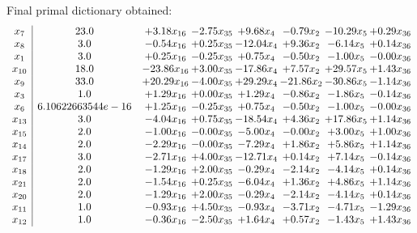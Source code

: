 \documentclass[8pt]{article}
\begin{document}
 Final primal dictionary obtained: 
\[\begin{array}{c| c c@{\hskip 2pt} c@{\hskip 2pt} c@{\hskip 2pt} c@{\hskip 2pt} c@{\hskip 2pt} c@{\hskip 2pt} }
 x_{7}   &  23.0 & +  3.18 x_{16} & -2.75 x_{35} & +  9.68 x_{4} & -0.79 x_{2} & -10.29 x_{5} & +  0.29 x_{36}\\
 x_{8}   &  3.0 & -0.54 x_{16} & +  0.25 x_{35} & -12.04 x_{4} & +  9.36 x_{2} & -6.14 x_{5} & +  0.14 x_{36}\\
 x_{1}   &  3.0 & +  0.25 x_{16} & -0.25 x_{35} & +  0.75 x_{4} & -0.50 x_{2} & -1.00 x_{5} & -0.00 x_{36}\\
 x_{10}   &  18.0 & -23.86 x_{16} & +  3.00 x_{35} & -17.86 x_{4} & +  7.57 x_{2} & + 29.57 x_{5} & +  1.43 x_{36}\\
 x_{9}   &  33.0 & + 20.29 x_{16} & -4.00 x_{35} & + 29.29 x_{4} & -21.86 x_{2} & -30.86 x_{5} & -1.14 x_{36}\\
 x_{3}   &  1.0 & +  1.29 x_{16} & +  0.00 x_{35} & +  1.29 x_{4} & -0.86 x_{2} & -1.86 x_{5} & -0.14 x_{36}\\
 x_{6}   &  6.10622663544e-16 & +  1.25 x_{16} & -0.25 x_{35} & +  0.75 x_{4} & -0.50 x_{2} & -1.00 x_{5} & -0.00 x_{36}\\
 x_{13}   &  3.0 & -4.04 x_{16} & +  0.75 x_{35} & -18.54 x_{4} & +  4.36 x_{2} & + 17.86 x_{5} & +  1.14 x_{36}\\
 x_{15}   &  2.0 & -1.00 x_{16} & -0.00 x_{35} & -5.00 x_{4} & -0.00 x_{2} & +  3.00 x_{5} & +  1.00 x_{36}\\
 x_{14}   &  2.0 & -2.29 x_{16} & -0.00 x_{35} & -7.29 x_{4} & +  1.86 x_{2} & +  5.86 x_{5} & +  1.14 x_{36}\\
 x_{17}   &  3.0 & -2.71 x_{16} & +  4.00 x_{35} & -12.71 x_{4} & +  0.14 x_{2} & +  7.14 x_{5} & -0.14 x_{36}\\
 x_{18}   &  2.0 & -1.29 x_{16} & +  2.00 x_{35} & -0.29 x_{4} & -2.14 x_{2} & -4.14 x_{5} & +  0.14 x_{36}\\
 x_{21}   &  2.0 & -1.54 x_{16} & +  0.25 x_{35} & -6.04 x_{4} & +  1.36 x_{2} & +  4.86 x_{5} & +  1.14 x_{36}\\
 x_{20}   &  2.0 & -1.29 x_{16} & +  2.00 x_{35} & -0.29 x_{4} & -2.14 x_{2} & -4.14 x_{5} & +  0.14 x_{36}\\
 x_{11}   &  1.0 & -0.93 x_{16} & +  4.50 x_{35} & -0.93 x_{4} & -3.71 x_{2} & -4.71 x_{5} & -1.29 x_{36}\\
 x_{12}   &  1.0 & -0.36 x_{16} & -2.50 x_{35} & +  1.64 x_{4} & +  0.57 x_{2} & -1.43 x_{5} & +  1.43 x_{36}\\

\end{array}\]
\end{document}
